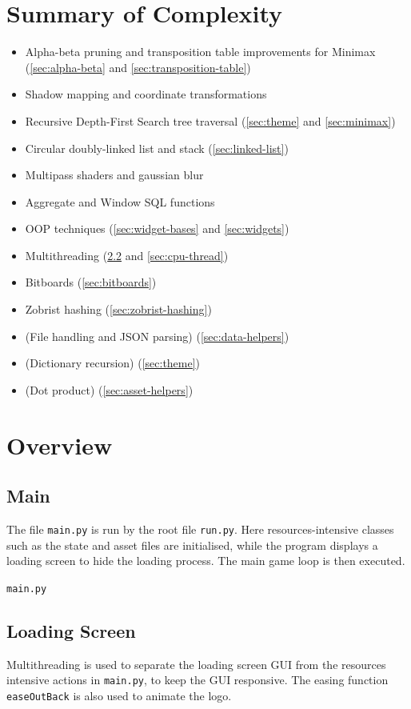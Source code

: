 \documentclass[../main/main.tex]{subfiles}
\begin{document}
\section{Summary of Complexity}
\begin{itemize}
\item Alpha-beta pruning and transposition table improvements for Minimax (\ref{sec:alpha-beta} and \ref{sec:transposition-table})
\item Shadow mapping and coordinate transformations
\item Recursive Depth-First Search tree traversal (\ref{sec:theme} and \ref{sec:minimax})
\item Circular doubly-linked list and stack (\ref{sec:linked-list})
\item Multipass shaders and gaussian blur
\item Aggregate and Window SQL functions
\item OOP techniques (\ref{sec:widget-bases} and \ref{sec:widgets})
\item Multithreading (\ref{sec:loading-screen} and \ref{sec:cpu-thread})
\item Bitboards (\ref{sec:bitboards})
\item Zobrist hashing (\ref{sec:zobrist-hashing})
\item (File handling and JSON parsing) (\ref{sec:data-helpers})
\item (Dictionary recursion) (\ref{sec:theme})
\item (Dot product) (\ref{sec:asset-helpers})
\end{itemize}

\section{Overview}
\subsection{Main}
The file \lstinline{main.py} is run by the root file \lstinline{run.py}. Here resources-intensive classes such as the state and asset files are initialised, while the program displays a loading screen to hide the loading process. The main game loop is then executed.

\noindent\verb|main.py|


\subsection{Loading Screen}
\label{sec:loading-screen}
Multithreading is used to separate the loading screen GUI from the resources intensive actions in \lstinline{main.py}, to keep the GUI responsive. The easing function \lstinline{easeOutBack} is also used to animate the logo.
\end{document}
